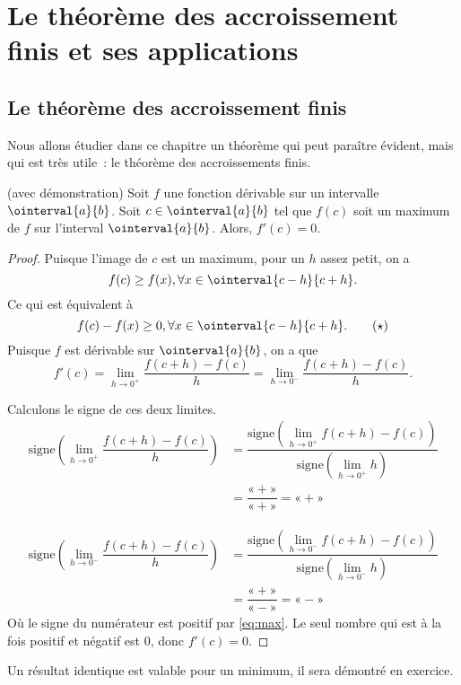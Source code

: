 \newpage
\section{Le théorème des accroissement finis et ses applications}

\subsection{Le théorème des accroissement finis}
Nous allons étudier dans ce chapitre un théorème qui peut paraître évident, mais qui est très utile~: le théorème des accroissements finis. 
\medskip

\begin{prop}[label=prop:max]
	(avec démonstration)
	\tcblower
	Soit $f$ une fonction dérivable sur un intervalle $\ointerval{a}{b}$. Soit $c\in \ointerval{a}{b}$ tel que $f(c)$ soit un maximum de $f$ sur l'interval $\ointerval{a}{b}$. Alors, $f'(c)=0$.

	\begin{proof}
	Puisque l'image de $c$ est un maximum, pour un $h$ assez petit, on a
	\[f(c)\geq f(x),  \forall x\in \ointerval{c-h}{c+h}.\]	
	Ce qui est équivalent à 
	\begin{equation}
	f(c)-f(x)\geq 0,  \forall x\in \ointerval{c-h}{c+h}.
	\tag{$\star$}
	\label{eq:max}
\end{equation}
	Puisque $f$ est dérivable sur $\ointerval{a}{b}$, on a que  
	\[f'(c)=\lim_{h\to 0^+}\dfrac{f(c+h)-f(c)}{h}=\lim_{h\to 0^-}\dfrac{f(c+h)-f(c)}{h}.\]

	Calculons le signe de ces deux limites.
	\begin{align*}
		\text{signe}\left(\lim_{h\to 0^+}\dfrac{f(c+h)-f(c)}{h}\right)&=\dfrac{\text{signe}\left(\displaystyle{\lim_{h\to 0^+}}f(c+h)-f(c)\right)}{\text{signe}\left(\displaystyle{\lim_{h\to 0^+}}h\right)}\\
		&=\dfrac{«+»}{«+»}=«+»
\end{align*}

	\begin{align*}
		\text{signe}\left(\lim_{h\to 0^-}\dfrac{f(c+h)-f(c)}{h}\right)&=\dfrac{\text{signe}\left(\displaystyle{\lim_{h\to 0^-}}f(c+h)-f(c)\right)}{\text{signe}\left(\displaystyle{\lim_{h\to 0^-}}h\right)}\\
		&=\dfrac{«+»}{«-»}=«-»
\end{align*}
Où le signe du numérateur est positif par \eqref{eq:max}. 
	Le seul nombre qui est à la fois positif et négatif est $0$, donc $f'(c)=0$.
	\end{proof}
\end{prop}
\begin{remarque}
	\tcblower
Un résultat identique est valable pour un minimum, il sera démontré en exercice.
\end{remarque}

